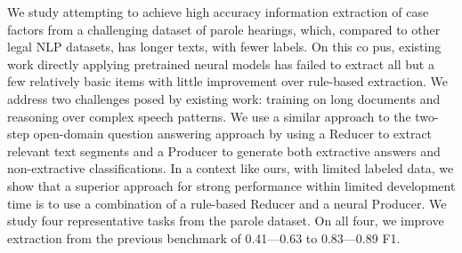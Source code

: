 We study attempting to achieve high accuracy information extraction of case factors from a challenging dataset of parole hearings, which, compared to other legal NLP datasets, has longer texts, with fewer labels. On this co pus, existing work directly applying pretrained neural models has failed to extract all but a few relatively basic items with little improvement over rule-based extraction. We address two challenges posed by existing work: training on long documents and reasoning over complex speech patterns. We use a similar approach to the two-step open-domain question answering approach by using a Reducer to extract relevant text segments and a Producer to generate both extractive answers and non-extractive classifications. In a context like ours, with limited labeled data, we show that a superior approach for strong performance within limited development time is to use a combination of a rule-based Reducer and a neural Producer. We study four representative tasks from the parole dataset. On all four, we improve extraction from the previous benchmark of 0.41---0.63 to 0.83---0.89 F1.
